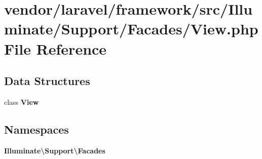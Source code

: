 \section{vendor/laravel/framework/src/\+Illuminate/\+Support/\+Facades/\+View.php File Reference}
\label{vendor_2laravel_2framework_2src_2_illuminate_2_support_2_facades_2view_8php}
\subsection*{Data Structures}
\begin{DoxyCompactItemize}
\item 
class {\bf View}
\end{DoxyCompactItemize}
\subsection*{Namespaces}
\begin{DoxyCompactItemize}
\item 
 {\bf Illuminate\textbackslash{}\+Support\textbackslash{}\+Facades}
\end{DoxyCompactItemize}
